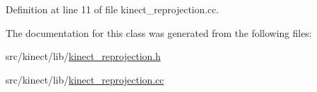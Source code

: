 Definition at line 11 of file kinect\+\_\+reprojection.\+cc.



The documentation for this class was generated from the following files\+:\begin{DoxyCompactItemize}
\item 
src/kinect/lib/\hyperlink{kinect__reprojection_8h}{kinect\+\_\+reprojection.\+h}\item 
src/kinect/lib/\hyperlink{kinect__reprojection_8cc}{kinect\+\_\+reprojection.\+cc}\end{DoxyCompactItemize}
